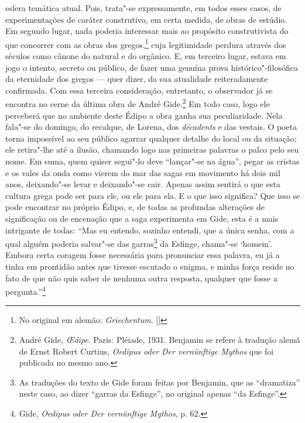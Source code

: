 esfera temática atual. Pois, trata"-se expressamente, em todos esses
casos, de experimentações de caráter construtivo, em certa medida, de
obras de estúdio. Em segundo lugar, nada poderia
interessar mais ao propósito construtivista do que concorrer com as obras
dos gregos,\footnote{No original em alemão: \emph{Griechentum}. []} cuja legitimidade perdura através dos
séculos como cânone do natural e do orgânico. E, em terceiro lugar,
estava em jogo o intento, secreto ou público, de fazer uma genuína prova
histórico"-filosófica da eternidade dos gregos --- quer dizer, da sua
atualidade reiteradamente confirmada. Com essa terceira consideração,
entretanto, o observador já se encontra no cerne da última obra de André
Gide.\footnote{André Gide, \emph{\OE dipe}. Paris: Pléiade, 1931.
  Benjamin se refere à tradução alemã de Ernst Robert Curtius,
  \emph{Oedipus oder Der vernünftige Mythos} que foi publicada no mesmo
  ano. \versal{[N.~T.]}} Em todo caso, logo ele perceberá que no ambiente deste Édipo a
obra ganha sua peculiaridade. Nela fala"-se do domingo, do recalque, de
Lorena, dos \emph{décadents} e das vestais. O poeta torna
impossível ao seu público agarrar qualquer detalhe do local ou da
situação; ele retira"-lhe até a ilusão, chamando logo nas primeiras
palavras o palco pelo seu nome. Em suma, quem quiser segui"-lo deve
``lançar"-se na água'', pegar as cristas e os vales da onda como vierem
do mar das sagas em movimento há dois mil anos, deixando"-se levar e
deixando"-se cair. Apenas assim sentirá o que esta cultura grega pode
ser para ele, ou ele para ela. E o que isso significa? Que
isso se pode encontrar no próprio Édipo, e, de todas as profundas alterações de significação ou de
encenação que a saga experimenta em Gide, esta é a mais intrigante de
todas: ``Mas eu entendo, sozinho entendi, que a única senha, com a qual
alguém poderia salvar"-se das garras\footnote{As traduções do texto
  de Gide foram feitas por Benjamin, que as ``dramatiza'' neste caso, ao
  dizer ``garras da Esfinge'', no original apenas ``da Esfinge''. \versal{[N.~O.]}} da
Esfinge, chama"-se `homem'. Embora certa coragem fosse necessária para
pronunciar essa palavra, eu já a tinha em prontidão antes que tivesse
escutado o enigma, e minha força reside no fato de que não quis saber de
nenhuma outra resposta, qualquer que fosse a pergunta.''\footnote{Gide, \emph{Oedipus oder Der vernünftige Mythos}, p. 62. \versal{[N.~T.]}}

